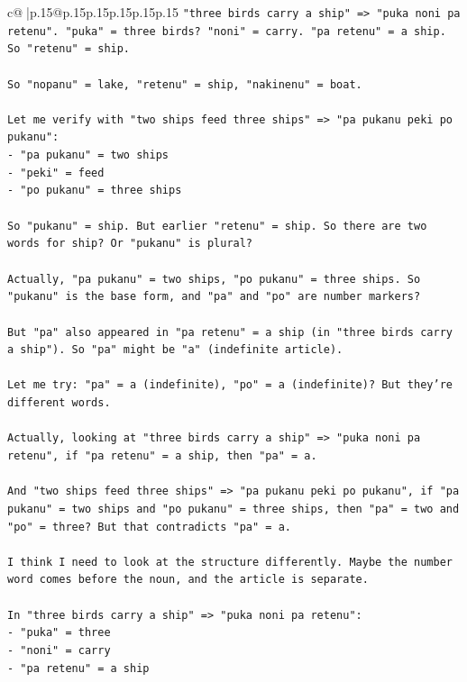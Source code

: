 \documentclass{article}
\begin{document}
{\begin{supertabular}{c@{$\;$}|p{.15\linewidth}@{}p{.15\linewidth}p{.15\linewidth}p{.15\linewidth}p{.15\linewidth}p{.15\linewidth}}
{{{\texttt{"three birds carry a ship" => "puka noni pa retenu". "puka" = three birds? "noni" = carry. "pa retenu" = a ship. So "retenu" = ship.} \\
\\ 
\texttt{So "nopanu" = lake, "retenu" = ship, "nakinenu" = boat.} \\
\\ 
\texttt{Let me verify with "two ships feed three ships" => "pa pukanu peki po pukanu":} \\
\texttt{{-} "pa pukanu" = two ships} \\
\texttt{{-} "peki" = feed} \\
\texttt{{-} "po pukanu" = three ships} \\
\\ 
\texttt{So "pukanu" = ship. But earlier "retenu" = ship. So there are two words for ship? Or "pukanu" is plural?} \\
\\ 
\texttt{Actually, "pa pukanu" = two ships, "po pukanu" = three ships. So "pukanu" is the base form, and "pa" and "po" are number markers?} \\
\\ 
\texttt{But "pa" also appeared in "pa retenu" = a ship (in "three birds carry a ship"). So "pa" might be "a" (indefinite article).} \\
\\ 
\texttt{Let me try: "pa" = a (indefinite), "po" = a (indefinite)? But they're different words.} \\
\\ 
\texttt{Actually, looking at "three birds carry a ship" => "puka noni pa retenu", if "pa retenu" = a ship, then "pa" = a.} \\
\\ 
\texttt{And "two ships feed three ships" => "pa pukanu peki po pukanu", if "pa pukanu" = two ships and "po pukanu" = three ships, then "pa" = two and "po" = three? But that contradicts "pa" = a.} \\
\\ 
\texttt{I think I need to look at the structure differently. Maybe the number word comes before the noun, and the article is separate.} \\
\\ 
\texttt{In "three birds carry a ship" => "puka noni pa retenu":} \\
\texttt{{-} "puka" = three} \\
\texttt{{-} "noni" = carry} \\
\texttt{{-} "pa retenu" = a ship} \\
}}}
\end{supertabular}}
\end{document}
